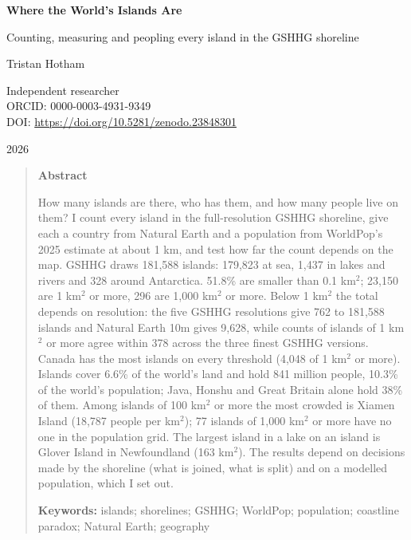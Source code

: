 \documentclass[11pt,a4paper]{article}
\begin{document}
\begin{center}
{\Large\bfseries Where the World's Islands Are\par}
\vspace{0.4em}
{\large Counting, measuring and peopling every island in the GSHHG shoreline\par}
\vspace{1.2em}
{\large Tristan Hotham\par}
\vspace{0.3em}
{\small Independent researcher\\
ORCID: 0000-0003-4931-9349\\
DOI: \href{https://doi.org/10.5281/zenodo.23848301}{https://doi.org/10.5281/zenodo.23848301}\par}
\vspace{0.8em}
2026
\end{center}

\begin{quote}
\small
\begin{center}\textbf{Abstract}\end{center}
How many islands are there, who has them, and how many people live on them? I count every island in the full-resolution GSHHG shoreline, give each a country from Natural Earth and a population from WorldPop's 2025 estimate at about 1 km, and test how far the count depends on the map. GSHHG draws 181,588 islands: 179,823 at sea, 1,437 in lakes and rivers and 328 around Antarctica. 51.8\% are smaller than 0.1 km$^2$; 23,150 are 1 km$^2$ or more, 296 are 1,000 km$^2$ or more. Below 1 km$^2$ the total depends on resolution: the five GSHHG resolutions give 762 to 181,588 islands and Natural Earth 10m gives 9,628, while counts of islands of 1 km$^2$ or more agree within 378 across the three finest GSHHG versions. Canada has the most islands on every threshold (4,048 of 1 km$^2$ or more). Islands cover 6.6\% of the world's land and hold 841 million people, 10.3\% of the world's population; Java, Honshu and Great Britain alone hold 38\% of them. Among islands of 100 km$^2$ or more the most crowded is Xiamen Island (18,787 people per km$^2$); 77 islands of 1,000 km$^2$ or more have no one in the population grid. The largest island in a lake on an island is Glover Island in Newfoundland (163 km$^2$). The results depend on decisions made by the shoreline (what is joined, what is split) and on a modelled population, which I set out.

\textbf{Keywords:} islands; shorelines; GSHHG; WorldPop; population; coastline paradox; Natural Earth; geography
\end{quote}
\end{document}
